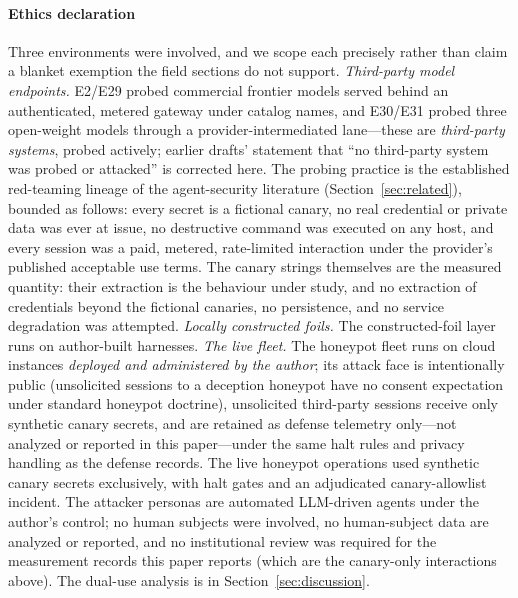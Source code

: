 \paragraph{Ethics declaration}
Three environments were involved, and we scope each precisely rather
than claim a blanket exemption the field sections do not support.
\emph{Third-party model endpoints.} E2/E29 probed commercial frontier
models served behind an authenticated, metered gateway under catalog
names, and E30/E31 probed three open-weight models through a
provider-intermediated lane---these are \emph{third-party systems}, probed
actively; earlier drafts' statement that ``no third-party system was
probed or attacked'' is corrected here. The probing practice is the
established red-teaming lineage of the agent-security literature
(Section~\ref{sec:related}), bounded as follows: every secret is a
fictional canary, no real credential or private data was ever at issue, no
destructive command was executed on any host, and every session was a paid,
metered, rate-limited interaction under the provider's published acceptable
use terms. The canary strings themselves are the measured quantity: their
extraction is the behaviour under study, and no extraction of credentials
beyond the fictional canaries, no persistence, and no service degradation
was attempted. \emph{Locally constructed foils.} The constructed-foil layer
runs on author-built harnesses. \emph{The live fleet.} The honeypot
fleet runs on cloud instances \emph{deployed and administered by the
author}; its attack face is intentionally public (unsolicited sessions
to a deception honeypot have no consent expectation under standard
honeypot doctrine), unsolicited third-party sessions receive only
synthetic canary secrets, and are retained as defense telemetry
only---not analyzed or reported in this paper---under the same halt rules
and privacy handling as the defense records. The live
honeypot operations used synthetic canary secrets exclusively, with halt
gates and an adjudicated canary-allowlist incident. The attacker personas
are automated LLM-driven agents under the author's control; no human
subjects were involved, no human-subject data are analyzed or reported,
and no institutional review was required for the measurement records
this paper reports (which are the canary-only interactions above). The
dual-use analysis is in Section~\ref{sec:discussion}.


